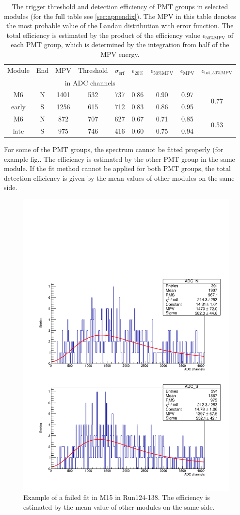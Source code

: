 \begin{table}[htb!]
  \caption{The trigger threshold and detection efficiency of PMT groups in selected modules (for the full table see \ref{sec:appendix}). The MPV in this table denotes the most probable value of the Landau distribution with error function. The total efficiency is estimated by the product of the efficiency value $\epsilon_{50\%\mathrm{MPV}}$ of each PMT group, which is determined by the integration from half of the MPV energy. }
  \label{tab:efficiency_short}
  \begin{tabular}{c c c c c c c c c}
    \toprule
    Module & End & MPV & Threshold & $\sigma{}_{\mathrm{erf}}$ & $\epsilon_{20\%}$ & $\epsilon_{50\%\mathrm{MPV}}$ & $\epsilon_{\mathrm{MPV}}$ & $\epsilon_{\mathrm{tot}, 50\%\mathrm{MPV}}$ \\
           &     & \multicolumn{3}{|c|}{in ADC channels} &   \\
    \midrule
    M6     & N & 1401 & 532 & 737 & 0.86 & 0.90 & 0.97 & \multirow{2}{*}{0.77}\\
    early  & S & 1256 & 615 & 712 & 0.83 & 0.86 & 0.95 &\\
    M6     & N & 872 & 707 & 627 & 0.67 & 0.71 & 0.85 & \multirow{2}{*}{0.53}\\
    late   & S & 975 & 746 & 416 & 0.60 & 0.75 & 0.94\\
    \midrule

    \bottomrule
  \end{tabular}
\end{table}



For some of the PMT groups, the spectrum cannot be fitted properly (for example fig.\). The efficiency is estimated by the other PMT group in the same module. If the fit method cannot be applied for both PMT groups, the total detection efficiency is given by the mean values of other modules on the same side.


\begin{figure}[ht]
  \centering
  \includegraphics[width=0.6\textwidth{}]{./fig/LandauFitM6.pdf}
  \caption{Example of a failed fit in M15 in Run124-138. The efficiency is estimated by the mean value of other modules on the same side.}
  \label{fig:Landau_M6}
\end{figure}








